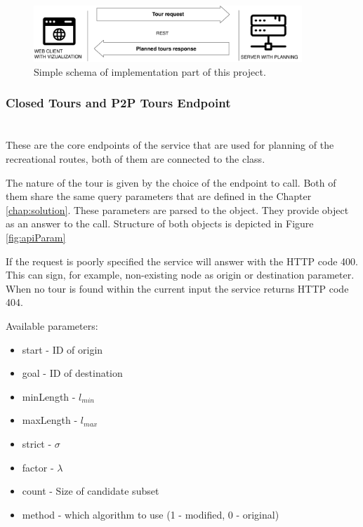 \documentclass{ctuthesis}
\begin{document}
\begin{figure}[H]
	\includegraphics[width=0.9\textwidth]{communication}
	\caption{Simple schema of implementation part of this project.}
\end{figure}

\subsubsection{Closed Tours and P2P Tours Endpoint
   \\ {}
   \\ {}
   }
   These are the core endpoints of the service that are used for planning of the recreational routes, both of them are connected to the  class.\par The nature of the tour is given by the choice of the endpoint to call. Both of them share the same query parameters that are defined in the Chapter \ref{chap:solution}. These parameters are parsed to the  object. They provide  object as an answer to the call. Structure of both objects is depicted in Figure \ref{fig:apiParam} \par
   If the request is poorly specified the service will answer with the HTTP code 400. This can sign, for example, non-existing node as origin or destination parameter. When no tour is found within the current input the service returns HTTP code 404.

   	\begin{minipage}[t]{1\textwidth}
		Available parameters:
		\begin{itemize}
			\item start - ID of origin
			\item goal - ID of destination
  			\item minLength - \(l_{min}\)
  			\item maxLength - \(l_{max}\)
  			\item strict - \(\sigma\)
  			\item factor - \(\lambda\)
  			\item count - Size of candidate subset
  			\item method - which algorithm to use (1 - modified, 0 - original)
		\end{itemize}
	\end{minipage}
\end{document}
